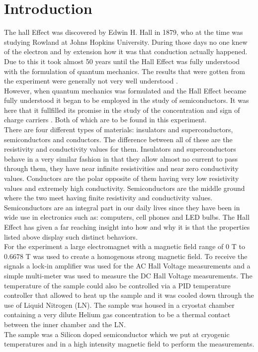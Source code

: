 \documentclass[twocolumn]{article}
\begin{document}
\section{Introduction}
The hall Effect was discovered by Edwin H. Hall in 1879, who at the time was 
studying Rowland at Johns Hopkins University. During those days no one knew of 
the electron and by extension how it was that conduction actually happened. 
Due to this it took almost 50 years until the Hall Effect was fully understood 
with the formulation of quantum mechanics. The results that were gotten from 
the experiment were generally not very well understood \cite{ref:1}.
\\
However, when quantum mechanics was formulated and the Hall Effect became fully 
understood it began to be employed in the study of semiconductors. It was here 
that it fullfilled its promise in the study of the concentration and sign of 
charge carriers \cite{ref:1}. Both of which are to be found in this experiment. 
\\
There are four different types of materials: insulators and superconductors, 
semiconductors and conductors. The difference between all of these are the 
resistivity and conductivity values for them. Insulators and superconductors 
behave in a very similar fashion in that they allow almost no current to pass 
through them, they have near infinite resistivities and near zero conductivity 
values. Conductors are the polar opposite of them having very low resistivity 
values and extremely high conductivity. Semiconductors are the middle ground 
where the two meet having finite resistivity and conductivity values.
\\
Semiconductors are an integral 
part in our daily lives since they have been in wide use in electronics such 
as: computers, cell phones and LED bulbs. The Hall Effect has given a far 
reaching insight into how and why it is that the properties listed above 
display such distinct behaviors.
\\
For the experiment a large electromagnet with a magnetic field range of 0 T to 
0.6678 T was used to create a homogenous strong magnetic field. To receive the 
signals a lock-in amplifier was used for the AC Hall Voltage measurements and a 
simple multi-meter was used to measure the DC Hall Voltage measurements. The 
temperature of the sample could also be controlled via a PID temperature 
controller that allowed to heat up the sample and it was cooled down through 
the use of Liquid Nitrogen (LN). The sample was housed in a cryostat chamber 
containing a very dilute Helium gas concentration to be a thermal contact 
between the inner chamber and the LN.
\\
The sample was a Silicon doped semiconductor which we put at cryogenic 
temperatures and in a high intensity magnetic field to perform the measurements.
\end{document}
